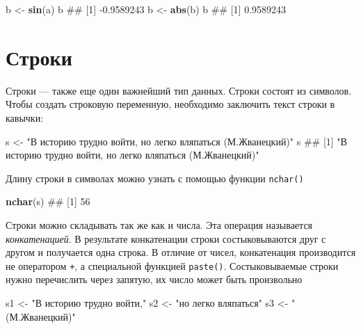 \documentclass[]{book}
\newenvironment{Shaded}{\begin{snugshade}}{\end{snugshade}}
\newcommand{\KeywordTok}[1]{\textcolor[rgb]{0.13,0.29,0.53}{\textbf{#1}}}
\newcommand{\StringTok}[1]{\textcolor[rgb]{0.31,0.60,0.02}{#1}}
\newcommand{\NormalTok}[1]{#1}
\begin{document}
\begin{Shaded}
\begin{Highlighting}[]
\NormalTok{b <-}\StringTok{ }\KeywordTok{sin}\NormalTok{(a)}
\NormalTok{b}
\NormalTok{## [1] -0.9589243}
\NormalTok{b <-}\StringTok{ }\KeywordTok{abs}\NormalTok{(b)}
\NormalTok{b}
\NormalTok{## [1] 0.9589243}
\end{Highlighting}
\end{Shaded}

\section{Строки}\label{strings}

Строки --- также еще один важнейший тип данных. Строки состоят из
символов. Чтобы создать строковую переменную, необходимо заключить текст
строки в кавычки:

\begin{Shaded}
\begin{Highlighting}[]
\NormalTok{s <-}\StringTok{ "В историю трудно войти, но легко вляпаться (М.Жванецкий)"}
\NormalTok{s}
\NormalTok{## [1] "В историю трудно войти, но легко вляпаться (М.Жванецкий)"}
\end{Highlighting}
\end{Shaded}

Длину строки в символах можно узнать с помощью функции \texttt{nchar()}

\begin{Shaded}
\begin{Highlighting}[]
\KeywordTok{nchar}\NormalTok{(s)}
\NormalTok{## [1] 56}
\end{Highlighting}
\end{Shaded}

Строки можно складывать так же как и числа. Эта операция называется
\emph{конкатенацией}. В результате конкатенации строки состыковываются
друг с другом и получается одна строка. В отличие от чисел, конкатенация
производится не оператором \texttt{+}, а специальной функцией
\texttt{paste()}. Состыковываемые строки нужно перечислить через
запятую, их число может быть произвольно

\begin{Shaded}
\begin{Highlighting}[]
\NormalTok{s1 <-}\StringTok{ "В историю трудно войти,"}
\NormalTok{s2 <-}\StringTok{ "но легко вляпаться"}
\NormalTok{s3 <-}\StringTok{ "(М.Жванецкий)"}
\end{Highlighting}
\end{Shaded}
\end{document}
